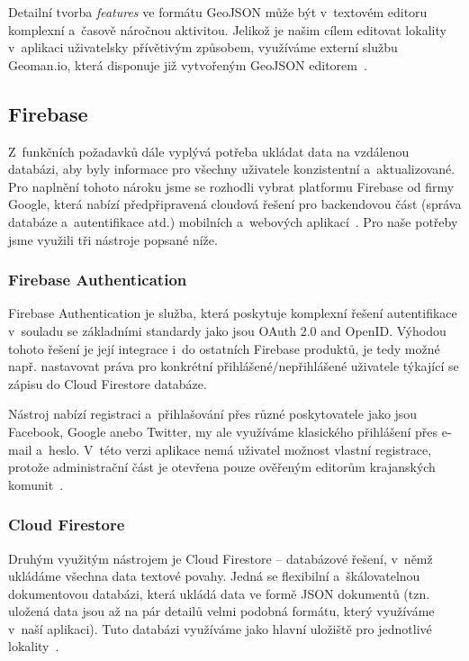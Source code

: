 Detailní tvorba \emph{features} ve formátu GeoJSON může být v~textovém editoru komplexní a~časově náročnou aktivitou. Jelikož je našim cílem editovat lokality v~aplikaci uživatelsky přívětivým způsobem, využíváme externí službu Geoman.io, která disponuje již vytvořeným GeoJSON editorem~\parencite{geoman}.

\hypertarget{firebase}{%
\subsection{Firebase}\label{firebase}}

Z~funkčních požadavků dále vyplývá potřeba ukládat data na vzdálenou databázi, aby byly informace pro všechny uživatele konzistentní a~aktualizované. Pro naplnění tohoto nároku jsme se rozhodli vybrat platformu Firebase od firmy Google, která nabízí předpřipravená cloudová řešení pro backendovou část (správa databáze a~autentifikace atd.) mobilních a~webových aplikací~\parencite{firebase}. Pro naše potřeby jsme využili tři nástroje popsané níže.

\hypertarget{firebase-authentication}{%
\subsubsection{Firebase Authentication}\label{firebase-authentication}}

Firebase Authentication je služba, která poskytuje komplexní řešení autentifikace v~souladu se základními standardy jako jsou OAuth 2.0 and OpenID. Výhodou tohoto řešení je její integrace i~do ostatních Firebase produktů, je tedy možné např. nastavovat práva pro konkrétní přihlášené/nepřihlášené uživatele týkající se zápisu do Cloud Firestore databáze.

Nástroj nabízí registraci a~přihlašování přes různé poskytovatele jako jsou Facebook, Google anebo Twitter, my ale využíváme klasického přihlášení přes e-mail a~heslo. V~této verzi aplikace nemá uživatel možnost vlastní registrace, protože administrační část je otevřena pouze ověřeným editorům krajanských komunit~\parencite{auth}.

\hypertarget{cloud-firestore}{%
\subsubsection{Cloud Firestore}\label{cloud-firestore}}

Druhým využitým nástrojem je Cloud Firestore -- databázové řešení, v~němž ukládáme všechna data textové povahy. Jedná se flexibilní a~škálovatelnou dokumentovou databázi, která ukládá data ve formě JSON dokumentů (tzn. uložená data jsou až na pár detailů velmi podobná formátu, který využíváme v~naší aplikaci). Tuto databázi využíváme jako hlavní uložiště pro jednotlivé lokality~\parencite{firestore}.

